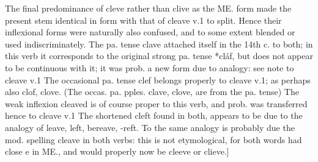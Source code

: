 \begin{description}[wide, labelwidth=!, labelindent=0pt]
The final predominance of cleve rather than clive as the ME. form made the present stem identical in form with that of cleave v.1 to split. Hence their inflexional forms were naturally also confused, and to some extent blended or used indiscriminately. The pa. tense clave attached itself in the 14th c. to both; in this verb it corresponds to the original strong pa. tense *cláf, but does not appear to be continuous with it; it was prob. a new form due to analogy: see note to cleave v.1 The occasional pa. tense clef belongs properly to cleave v.1; as perhaps also clof, clove. (The occas. pa. pples. clave, clove, are from the pa. tense) The weak inflexion cleaved is of course proper to this verb, and prob. was transferred hence to cleave v.1 The shortened cleft found in both, appears to be due to the analogy of leave, left, bereave, -reft. To the same analogy is probably due the mod. spelling cleave in both verbs: this is not etymological, for both words had close e in ME., and would properly now be cleeve or clieve.]

\begin{myenumerate}








\end{myenumerate}
\end{description}
